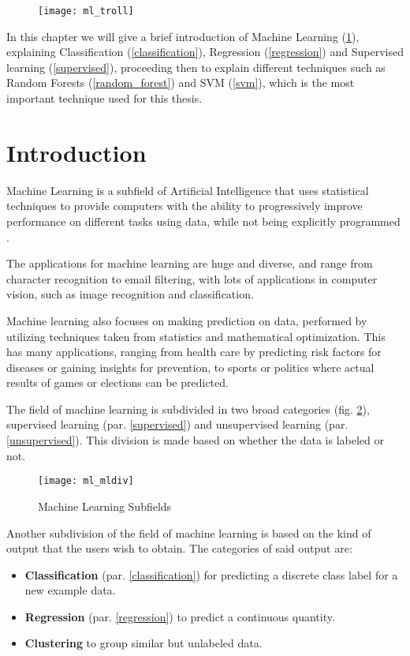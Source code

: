 \begin{figure}[H]
	\centering
	\texttt{[image: ml\_troll]}
	\label{fig:ml_troll}
\end{figure}

In this chapter we will give a brief introduction of Machine Learning (\ref{ml}), explaining Classification (\ref{classification}), Regression (\ref{regression}) and Supervised learning (\ref{supervised}), proceeding then to explain different techniques such as Random Forests (\ref{random_forest}) and SVM (\ref{svm}), which is the most important technique used for this thesis.

\section{Introduction} \label{ml}

Machine Learning is a subfield of Artificial Intelligence that uses statistical techniques to provide computers with the ability to progressively improve performance on different tasks using data, while not being explicitly programmed \cite{wiki:ml}.

The applications for machine learning are huge and diverse, and range from character recognition to email filtering, with lots of applications in computer vision, such as image recognition and classification.

Machine learning also focuses on making prediction on data, performed by utilizing techniques taken from statistics and mathematical optimization. This has many applications, ranging from health care by predicting risk factors for diseases or gaining insights for prevention, to sports or politics where actual results of games or elections can be predicted.

The field of machine learning is subdivided in two broad categories (fig. \ref{fig:ml_mldiv}), supervised learning (par. \ref{supervised}) and unsupervised learning (par. \ref{unsupervised}). This division is made based on whether the data is labeled or not.

\begin{figure}[H]
	\centering
	\texttt{[image: ml\_mldiv]}
	\caption{Machine Learning Subfields \cite{ml_mldiv}}
	\label{fig:ml_mldiv}
\end{figure}

Another subdivision of the field of machine learning is based on the kind of output that the users wish to obtain. The categories of said output are:
\begin{itemize}[noitemsep]
	\item \textbf{Classification} (par. \ref{classification}) for predicting a discrete class label for a new example data.
	\item \textbf{Regression} (par. \ref{regression}) to predict a continuous quantity.
	\item \textbf{Clustering} to group similar but unlabeled data.
\end{itemize}

